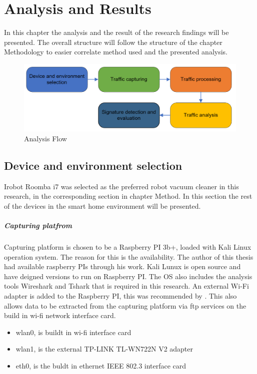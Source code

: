 \chapter{Analysis and Results}
In this chapter the analysis and the result of the research findings will be presented. The overall structure will follow the structure of the chapter Methodology to easier correlate method used and the presented analysis. 

\begin{figure}[H]
    \centering
    \includegraphics[width=\textwidth]{figures/AnalysisFlow.png}
    \caption{Analysis Flow}
    \label{fig:AnalysisFlow}
\end{figure}

\section{Device and environment selection}
Irobot Roomba i7 was selected as the preferred robot vacuum cleaner in this research, in the corresponding section in chapter Method. In this section the rest of the devices in the smart home environment will be presented. 

\paragraph{Capturing platfrom}
Capturing platform is chosen to be a Raspberry PI 3b+, loaded with Kali Linux operation system. The reason for this is the availability. The author of this thesis had available raspberry PIs through his work. Kali Lunux is open source and have deigned versions to run on Raspberry PI. The OS also includes the analysis tools Wireshark and Tshark that is required in this research. 
An external Wi-Fi adapter is added to the Raspberry PI, this was recommended by \cite{wifi_adapter_monitor_mode}. This also allows data to be extracted from the capturing platform via ftp services on the build in wi-fi network interface card.

\begin{itemize}
    \item wlan0, is buildt in wi-fi interface card
    \item wlan1, is the external TP-LINK TL-WN722N V2 adapter
    \item eth0, is the buldt in ethernet IEEE 802.3 interface card
\end{itemize}

